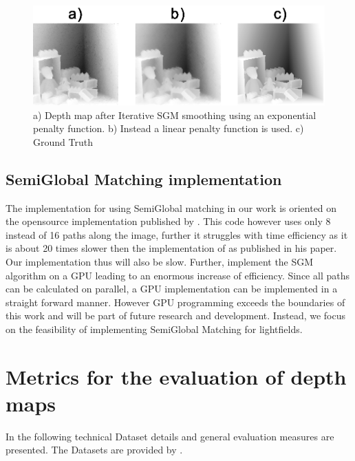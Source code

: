 \documentclass  [
  paper    = a4,
  BCOR     = 10mm,
  twoside,
  fontsize = 12pt,
  fleqn,
  toc      = bibnumbered,
  toc      = listofnumbered,
  numbers  = noendperiod,
  headings = normal,
  listof   = leveldown,
  version  = 3.03
]                                       {scrreprt}
\begin{document}
\begin{figure}
	\centering
	\includegraphics[width=1\linewidth]{images/linear_iteration}
	\caption[Linear Cost function results]{a) Depth map after Iterative SGM smoothing using an exponential penalty function. b) Instead a linear penalty function is used. c) Ground Truth}
	\label{fig:lineariteration}
\end{figure}
\subsection{SemiGlobal Matching implementation}
\label{sec:SGM_implement}
The implementation for using SemiGlobal matching in our work is oriented on the opensource implementation published by \cite{sgmimplement}. This code however uses only 8 instead of 16 paths along the image, further it struggles with time efficiency as it is about 20 times slower then the implementation of \cite{hirschmuller2005accurate} as published in his paper. Our implementation thus will also be slow. Further, \cite{ernst2008mutual} implement the SGM algorithm on a GPU leading to an enormous increase of efficiency. Since all paths can be calculated on parallel, a GPU implementation can be implemented in a straight forward manner. However GPU programming exceeds the boundaries of this work and will be part of future research and development. Instead, we focus on the feasibility of implementing SemiGlobal Matching for lightfields.
\section{Metrics for the evaluation of depth maps}
In the following technical Dataset details and general evaluation measures are presented. The Datasets are provided by \cite{honauer2016benchmark}.
\end{document}
